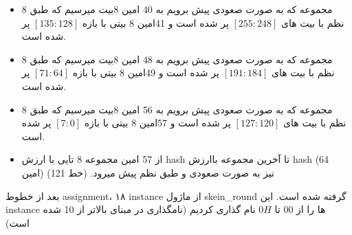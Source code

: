 \begin{itemize}
	\item
	       8 مجموعه که به صورت صعودی پیش برویم به 40 امین 8بیت میرسیم که طبق نظم با بیت های $[255:248]$ پر شده است و 41امین 8 بیتی با بازه $[135:128]$ پر شده است.
	\item
	       8 مجموعه که به صورت صعودی پیش برویم به 48 امین 8بیت میرسیم که طبق نظم با بیت های $[191:184]$ پر شده است و 49امین 8 بیتی با بازه $[71:64]$ پر شده است.
	\item
	       8 مجموعه که به صورت صعودی پیش برویم به 56 امین 8بیت میرسیم که طبق نظم با بیت های $[127:120]$ پر شده است و 57امین 8 بیتی با بازه $[7:0]$ پر شده است.
	\item
	      از 57 امین مجموعه 8 تایی با ارزش hash تا آخرین مجموعه باارزش hash (64 امین) نیز به صورت صعودی و طبق نظم پیش میرود. (خط 121)
	      
\end{itemize}

بعد از خطوط 
assignment،
 ۱۸ instance از ماژول skein\_round گرفته شده است.
این instance ها را از 
$00$
تا
$0H$
نام گذاری کردیم (نامگذاری در مبنای بالاتر از 10 شده است)


